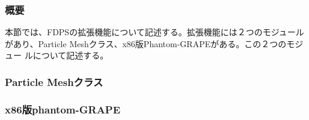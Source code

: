 \subsubsection{概要}

本節では、FDPSの拡張機能について記述する。拡張機能には２つのモジュール
があり、Particle Meshクラス、x86版Phantom-GRAPEがある。この２つのモジュー
ルについて記述する。

\subsubsection{Particle Meshクラス}
\label{sec:module_extended_PM}


\subsubsection{x86版phantom-GRAPE}


